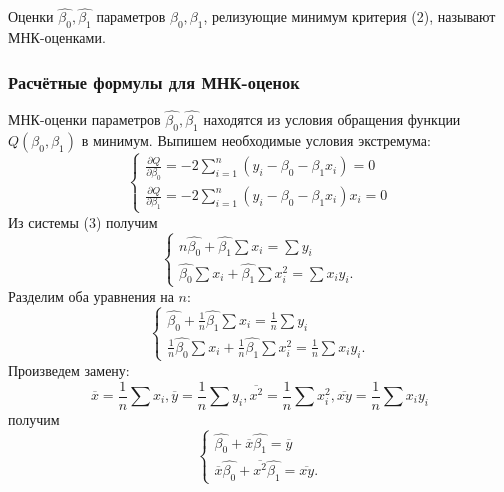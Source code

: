 Оценки $\hat{\beta_0} , \hat{\beta_1}$ параметров $\beta_0, \beta_1$, релизующие минимум критерия (2), называют МНК-оценками.  \cite{theory}

\subsubsection{Расчётные формулы для МНК-оценок}
МНК-оценки параметров $\hat{\beta_0}, \hat{\beta_1}$ находятся из условия обращения функции $Q(\beta_0, \beta_1)$ в минимум.
Выпишем необходимые условия экстремума:
\begin{equation} \label{eq:systen_extremum}
\begin{cases}
   \frac{\partial Q}{\partial \beta_0} = -2 \sum\limits_{i=1}^n (y_i - \beta_0 - \beta_1x_i) = 0 \\
   \frac{\partial Q}{\partial \beta_1} = -2 \sum\limits_{i=1}^n (y_i - \beta_0 - \beta_1x_i)x_i = 0
 \end{cases}
\end{equation}
Из системы (3) получим
\begin{equation} \label{eq:systen}
 \begin{cases}
 n\hat{\beta_0} + \hat{\beta_1}\sum x_i = \sum y_i \\
 \hat{\beta_0} \sum x_i + \hat{\beta_1} \sum x^2_i = \sum x_i y_i.
 \end{cases}
\end{equation}
Разделим оба уравнения на $n$:
\begin{equation} \label{eq:systen}
 \begin{cases}
 \hat{\beta_0} + \frac{1}{n}\hat{\beta_1}\sum x_i = \frac{1}{n}\sum y_i \\
 \frac{1}{n}  \hat{\beta_0} \sum x_i + \frac{1}{n} \hat{\beta_1} \sum x^2_i = \frac{1}{n} \sum x_i y_i.
 \end{cases}
\end{equation}
Произведем замену:
\begin{equation} \label{eq:systen}
\overline{x} = \frac{1}{n} \sum x_i, 
\overline{y} = \frac{1}{n} \sum y_i, 
\overline{x^2} = \frac{1}{n} \sum x^2_i, \overline{xy} = \frac{1}{n} \sum x_i y_i
\end{equation}
получим
\begin{equation} \label{eq:systen}
 \begin{cases}
   \hat{\beta_0} + \overline{x}\hat{\beta_1} = \overline{y}\\
   \overline{x} \hat{\beta_0} + \overline{x^2} \hat{\beta_1} = \overline{xy}.
 \end{cases}
\end{equation}
